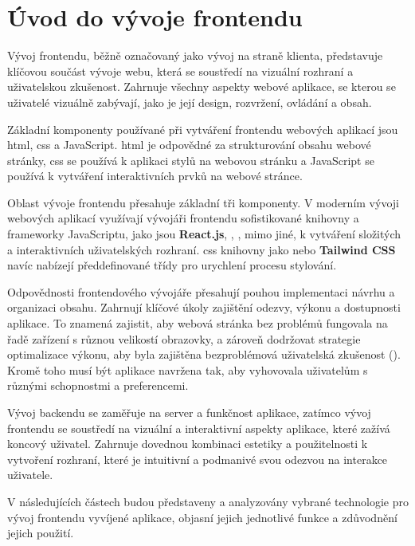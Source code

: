 \section{Úvod do vývoje frontendu}
\label{sec:implementace-uvod}
Vývoj frontendu, běžně označovaný jako vývoj na straně klienta, představuje klíčovou součást vývoje webu, která se soustředí na vizuální rozhraní a uživatelskou zkušenost.
Zahrnuje všechny aspekty webové aplikace, se kterou se uživatelé vizuálně zabývají, jako je její design, rozvržení, ovládání a obsah.

Základní komponenty používané při vytváření frontendu webových aplikací jsou \ac{html}, \ac{css} a JavaScript.
\ac{html} je odpovědné za strukturování obsahu webové stránky, \ac{css} se používá k aplikaci stylů na webovou stránku a JavaScript se používá k vytváření interaktivních prvků na webové stránce\cite{mdn_getting_started_with_the_web}.

Oblast vývoje frontendu přesahuje základní tři komponenty.
V moderním vývoji webových aplikací využívají vývojáři frontendu sofistikované knihovny a frameworky JavaScriptu, jako jsou \textbf{React.js}, , , mimo jiné, k vytváření složitých a interaktivních uživatelských rozhraní\cite{mdn_tools_and_testing_client_side_javascript_frameworks_introduction}.
\ac{css} knihovny jako  nebo \textbf{Tailwind CSS} navíc nabízejí předdefinované třídy pro urychlení procesu stylování\cite{bs_guide_top_css_frameworks}.

Odpovědnosti frontendového vývojáře přesahují pouhou implementaci návrhu a organizaci obsahu.
Zahrnují klíčové úkoly zajištění odezvy, výkonu a dostupnosti aplikace.
To znamená zajistit, aby webová stránka bez problémů fungovala na řadě zařízení s různou velikostí obrazovky, a zároveň dodržovat strategie optimalizace výkonu, aby byla zajištěna bezproblémová uživatelská zkušenost ().
Kromě toho musí být aplikace navržena tak, aby vyhovovala uživatelům s různými schopnostmi a preferencemi\cite{mdn_front_end_web_developer}.

Vývoj backendu se zaměřuje na server a funkčnost aplikace, zatímco vývoj frontendu se soustředí na vizuální a interaktivní aspekty aplikace, které zažívá koncový uživatel.
Zahrnuje dovednou kombinaci estetiky a použitelnosti k vytvoření rozhraní, které je intuitivní a podmanivé svou odezvou na interakce uživatele\cite{mdn_server_side_first_steps_introduction}.

V následujících částech budou představeny a analyzovány vybrané technologie pro vývoj frontendu vyvíjené aplikace, objasní jejich jednotlivé funkce a zdůvodnění jejich použití.
